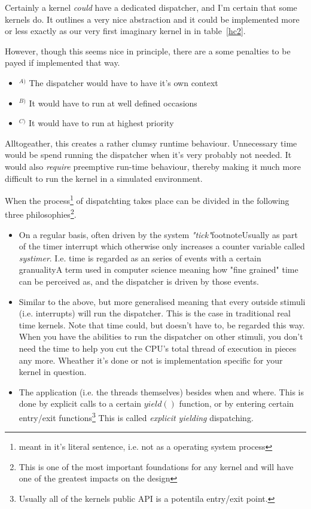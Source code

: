 Certainly a kernel \textit{could} have a dedicated dispatcher, and I'm certain that some kernels do. It outlines a very nice abstraction and it could be implemented more or less exactly as our very first imaginary kernel in in table~\ref{hc2}.

However, though this seems nice in principle, there are a some penalties to be payed if implemented that way.
\begin{itemize}
	\item $^{A)}$ The dispatcher would have to have it's own context
	\item $^{B)}$ It would have to run at well defined occasions
	\item $^{C)}$ It would have to run at highest priority
\end{itemize}
Alltogeather, this creates a rather clumsy runtime behaviour. Unnecessary time would be spend running the dispatcher when it's very probably not needed. It would also \textit{require} preemptive run-time behaviour, thereby making it much more difficult to run the kernel in a simulated environment.

When the process\footnote{meant in it's literal sentence, i.e. not as a operating system process} of dispatchting takes place can be divided in the following three philosophies\footnote{This is one of the most important foundations for any  kernel and will have one of the greatest impacts on the design}.
\begin{itemize}
	\item On a regular basis, often driven by the system \textit{"tick"}footnote{Usually as part of the timer interrupt which otherwise only increases a counter variable called \textit{systimer}}. I.e. time is regarded as an series of events with a certain granuality{A term used in computer science meaning how "fine grained" time can be perceived as}, and the dispatcher is driven by those events.
	\item Similar to the above, but more generalised meaning that every outside stimuli (i.e. interrupts) will run the dispatcher. This is the case in traditional real time kernels. Note that time could, but doesn't have to, be regarded this way. When you have the abilities to run the dispatcher on other stimuli, you don't need the time to help you cut the CPU's total thread of execution in pieces any more. Wheather it's done or not is implementation specific for your kernel in question.
	\item The application (i.e. the threads themselves) besides when and where. This is done by explicit calls to a certain $yield()$ function, or by entering certain entry/exit functions\footnote{Usually all of the kernels public API is a potentila entry/exit point.}  This is called \textit{explicit yielding} dispatching.
\end{itemize}

